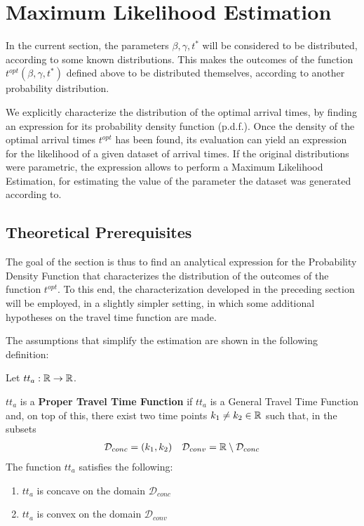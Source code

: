 \section{Maximum Likelihood Estimation}

In the current section,
the parameters \(\beta, \gamma, t^*\) will be considered to be distributed, according to some known distributions.
This makes the outcomes of the function \(t^{opt}(\beta, \gamma, t^*)\) defined above to be distributed themselves,
according to another probability distribution.

We explicitly characterize the distribution of the optimal arrival times,
by finding an expression for its probability density function (p.d.f.).
Once the density of the optimal arrival times \(t^{opt}\) has been found,
its evaluation can yield an expression for the likelihood of a given dataset of arrival times.
If the original distributions were parametric,
the expression allows to perform a Maximum Likelihood Estimation,
for estimating the value of the parameter the dataset was generated according to.

\subsection{Theoretical Prerequisites}


The goal of the section is thus to find an analytical expression for the Probability Density Function that characterizes the distribution of the outcomes of the function \(t^{opt}\).
To this end, the characterization developed in the preceding section will be employed,
in a slightly simpler setting, in which some additional hypotheses on the travel time function are made.

The assumptions that simplify the estimation are shown in the following definition:
\begin{definition}
  \label{def:proper_tt}
  Let \(tt_a:\mathbb{R}\rightarrow\mathbb{R}\).

  \(tt_a\) is a \textbf{Proper Travel Time Function} if \(tt_a\) is a General Travel Time Function and,
  on top of this, 
  there exist two time points \(k_1 \neq k_2 \in \mathbb{R}\) such that,
  in the subsets
  \begin{align}
    \label{eq:subs_conc_conv}
    \mathcal{D}_{conc} = (k_1, k_2) && \mathcal{D}_{conv} = \mathbb{R} \setminus \mathcal{D}_{conc}
  \end{align}
  The function \(tt_a\) satisfies the following:
  \begin{enumerate}
  \item \(tt_a\) is concave on the domain \(\mathcal{D}_{conc}\)
  \item \(tt_a\) is convex on the domain \(\mathcal{D}_{conv}\)
  \end{enumerate}
\end{definition}

